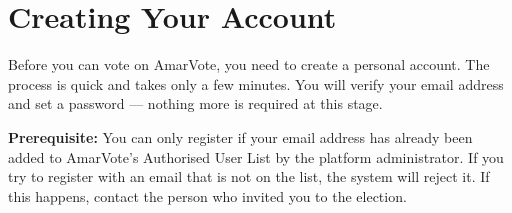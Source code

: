 \documentclass[12pt,a4paper,openany]{book}
\let\faSignInAlt\relax\newcommand{\faSignInAlt}{\faArrowRight}
\let\faShieldAlt\relax\newcommand{\faShieldAlt}{\faExclamationTriangle}
\let\faCheckDouble\relax\newcommand{\faCheckDouble}{\faCheck}
\begin{document}
\begin{center}
\end{center}

\mainmatter

\chapter{Creating Your Account}
\label{ch:registration}

Before you can vote on AmarVote, you need to create a personal account. The process is quick and takes only a few minutes. You will verify your email address and set a password --- nothing more is required at this stage.

\begin{tcolorbox}[warnbox]
	\textbf{Prerequisite:} You can only register if your email address has already been added to AmarVote's Authorised User List by the platform administrator. If you try to register with an email that is not on the list, the system will reject it. If this happens, contact the person who invited you to the election.
\end{tcolorbox}
\end{document}
